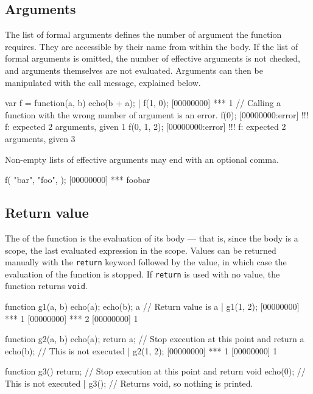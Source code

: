 \subsection{Arguments}

The list of formal arguments defines the number of argument the
function requires. They are accessible by their name from within the
body. If the list of formal arguments is omitted, the number of
effective arguments is not checked, and arguments themselves are not
evaluated. Arguments can then be manipulated with the call message,
explained below.

\begin{urbiscript}
var f = function(a, b) {
  echo(b + a);
}|
f(1, 0);
[00000000] *** 1
// Calling a function with the wrong number of argument is an error.
f(0);
[00000000:error] !!! f: expected 2 arguments, given 1
f(0, 1, 2);
[00000000:error] !!! f: expected 2 arguments, given 3
\end{urbiscript}

Non-empty lists of effective arguments may end with an optional comma.
\begin{urbiscript}
f(
  "bar",
  "foo",
 );
[00000000] *** foobar
\end{urbiscript}


\subsection{Return value}

The  of the function is the
evaluation of its body --- that is, since the body is a scope, the
last evaluated expression in the scope.  Values can be returned
manually with the \lstinline|return| keyword followed by the value, in
which case the evaluation of the function is stopped. If
\lstinline|return| is used with no value, the function returns
\lstinline|void|.

\begin{urbiscript}
function g1(a, b)
{
  echo(a);
  echo(b);
  a // Return value is a
}|
g1(1, 2);
[00000000] *** 1
[00000000] *** 2
[00000000] 1

function g2(a, b)
{
  echo(a);
  return a; // Stop execution at this point and return a
  echo(b); // This is not executed
}|
g2(1, 2);
[00000000] *** 1
[00000000] 1

function g3()
{
  return; // Stop execution at this point and return void
  echo(0); // This is not executed
}|
g3(); // Returns void, so nothing is printed.
\end{urbiscript}

